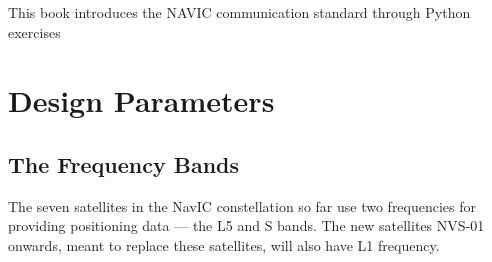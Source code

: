 \documentclass[11pt]{book}
\begin{document}

\setcounter{page}{1}

\begin{introduction}
This book introduces the NAVIC communication standard through Python exercises

\end{introduction}

\mainmatter
\chapter{Design Parameters}
\section{The Frequency Bands}

The seven satellites in the NavIC constellation so far use two frequencies for providing positioning data — the L5 and S bands. The new satellites NVS-01 onwards, meant to replace these satellites, will also have L1 frequency.
	
\end{document}
